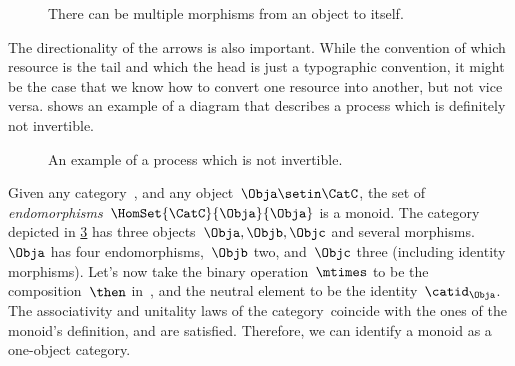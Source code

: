 \begin{figure}[h!]
    \centering
    \caption{There can be multiple morphisms from an object to itself.}
    \label{fig:e8}
\end{figure}

The directionality of the arrows is also important.
While the convention of which resource is the tail and which the head is just a typographic convention, it might be the case that we know how to convert one resource into another, but not vice versa.
 shows an example of a diagram that describes a process which is definitely not invertible.

\begin{figure}[h!]
    \centering
    \caption{An example of a process which is not invertible. }
    \label{fig:e10}
\end{figure}

\begin{example}
    Given any category~\CatC, and any object~$\Obja\setin \CatC$, the set of \emph{endomorphisms}~$\HomSet{\CatC}{\Obja}{\Obja}$ is a monoid.
    The category depicted in \cref{fig:monoid_endomorphisms} has three objects~$\Obja,\Objb,\Objc$ and several morphisms.~$\Obja$ has four endomorphisms,~$\Objb$ two, and~$\Objc$ three (including identity morphisms).
    Let's now take the binary operation~$\mtimes$ to be the composition~$\then$ in~\CatC, and the neutral element to be the identity~$\catid_\Obja$.
    The associativity and unitality laws of the category~\CatC coincide with the ones of the monoid's definition, and are satisfied.
    Therefore, we can identify a monoid as a one-object category.
\end{example}

\begin{figure}[h!]
    \centering
    \caption{}
    \label{fig:monoid_endomorphisms}
\end{figure}

